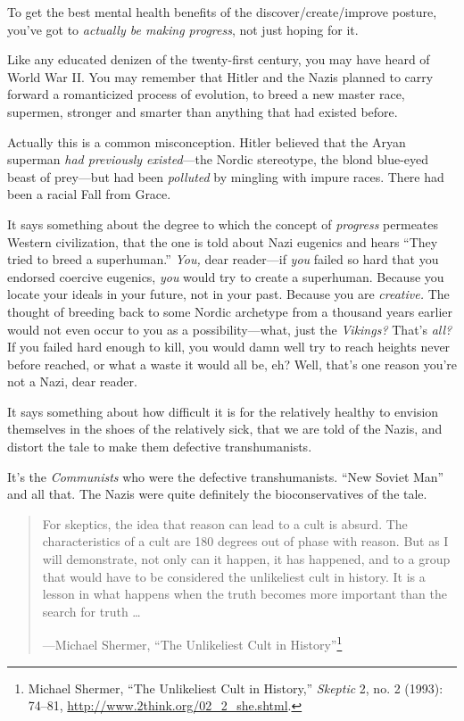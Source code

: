 {
 To get the best mental health benefits of the
discover/create/improve posture, you've got to
\textit{actually be making progress}, not just hoping for it.}

\myendsectiontext


\bigskip


{
 Like any educated denizen of the twenty-first century, you may
have heard of World War II. You may remember that Hitler and the Nazis
planned to carry forward a romanticized process of evolution, to breed
a new master race, supermen, stronger and smarter than anything that
had existed before. }

{
 Actually this is a common misconception. Hitler believed that the
Aryan superman \textit{had previously existed}{}---the Nordic
stereotype, the blond blue-eyed beast of prey---but had been
\textit{polluted} by mingling with impure races. There had been a
racial Fall from Grace.}

{
 It says something about the degree to which the concept of
\textit{progress} permeates Western civilization, that the one is told
about Nazi eugenics and hears ``They tried to breed a
superhuman.'' \textit{You,} dear reader---if
\textit{you} failed so hard that you endorsed coercive eugenics,
\textit{you} would try to create a superhuman. Because you locate your
ideals in your future, not in your past. Because you are
\textit{creative.} The thought of breeding back to some Nordic
archetype from a thousand years earlier would not even occur to you as
a possibility---what, just the \textit{Vikings?} That's
\textit{all?} If you failed hard enough to kill, you would damn well
try to reach heights never before reached, or what a waste it would all
be, eh? Well, that's one reason you're
not a Nazi, dear reader.}

{
 It says something about how difficult it is for the relatively
healthy to envision themselves in the shoes of the relatively sick,
that we are told of the Nazis, and distort the tale to make them
defective transhumanists.}

{
 It's the \textit{Communists} who were the
defective transhumanists. ``New Soviet
Man'' and all that. The Nazis were quite definitely
the bioconservatives of the tale.}

\myendsectiontext


\begin{quote}
{
 For skeptics, the idea that reason can lead to a cult is absurd.
The characteristics of a cult are 180 degrees out of phase with reason.
But as I will demonstrate, not only can it happen, it has happened, and
to a group that would have to be considered the unlikeliest cult in
history. It is a lesson in what happens when the truth becomes more
important than the search for truth \ldots}

{\raggedleft
 {}---Michael Shermer, ``The Unlikeliest Cult in
History''\footnote{Michael Shermer, ``The Unlikeliest Cult in
History,'' \textit{Skeptic} 2, no. 2 (1993): 74--81,
\url{http://www.2think.org/02\_2\_she.shtml}.}
\par}
\end{quote}


